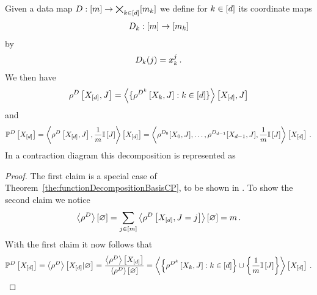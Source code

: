 \begin{theorem}
    \label{the:empCPRep}
    Given a data map $D: [m] \rightarrow \bigtimes_{k\in[d]}[m_{k}]$ we define for $k\in[d]$ its coordinate maps
    \begin{align*}
        D_{k} : [m] \rightarrow [m_{k}]
    \end{align*}
    by
    \begin{align*}
        D_{k}(j) = x_{k}^j \, .
    \end{align*}
    We then have
    \begin{align*}
        \rho^{D}\left[X_{[d]},J\right]
        = \left\langle 
            \{\rho^{D^{k}}\left[X_{k},J\right] : k\in[d] \}
        \right\rangle \left[ X_{[d]},J \right]
    \end{align*}
    and
    \begin{align*}
        \mathbb{P}^{D}\left[X_{[d]}\right]
        = \left\langle \rho^{D}\left[X_{[d]},J\right], \frac{1}{m}\mathbb{I}\left[J\right]\right\rangle \left[ X_{[d]} \right]
        = \left\langle \rho^{D_{0}}[X_{0},J],\ldots,\rho^{D_{d-1}}[X_{d-1},J],\frac{1}{m}\mathbb{I}\left[J\right]\right\rangle \left[ X_{[d]} \right] \, .
    \end{align*}
    In a contraction diagram this decomposition is represented as
    \begin{center}
        
    \end{center}
\end{theorem}
\begin{proof}
    The first claim is a special case of Theorem~\ref{the:functionDecompositionBasisCP}, to be shown in .
    To show the second claim we notice
    \[ \left\langle \rho^{D}\right\rangle \left[ \varnothing \right] = \sum_{j\in[m]} \left\langle \rho^{D}\left[X_{[d]},J=j\right]\right\rangle \left[ \varnothing \right] = m \,  . \]
    With the first claim it now follows that
    \begin{align*}
        \mathbb{P}^{D}\left[X_{[d]}\right]
        = \left\langle \rho^{D}\right\rangle \left[ X_{[d]} | \varnothing \right]
        = \frac{\left\langle \rho^{D}\right\rangle \left[ X_{[d]} \right]}{\left\langle \rho^{D}\right\rangle \left[ \varnothing \right]}
        =  \left\langle 
            \left\{\rho^{D^{k}}\left[X_{k},J\right] : k\in[d] \right\} \cup \left\{\frac{1}{m}\mathbb{I}\left[J\right]\right\}
        \right\rangle \left[ X_{[d]} \right]  \, .
    \end{align*}
\end{proof}



